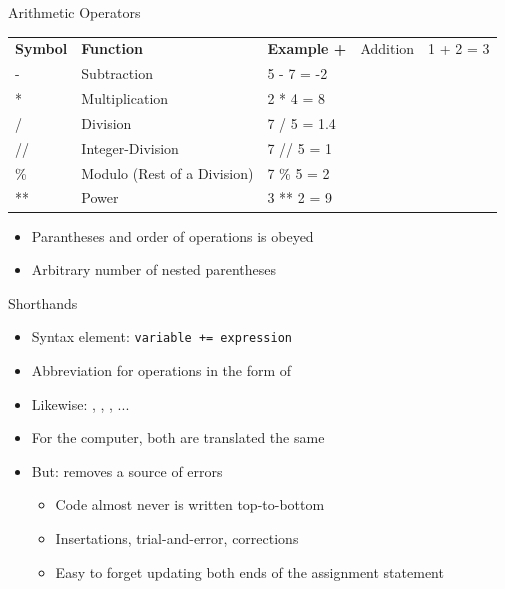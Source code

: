 \begin{frame}{Arithmetic Operators}
%
%
%
\begin{tabularx}
	{\linewidth}
	{OFX}
	\toprule[1.5pt]

	\normalfont	\bfseries Symbol &
				\bfseries Function &
				\bfseries Example
	\tabcrlf
	+  & Addition                    & 1 + 2 = 3 \\
	-  & Subtraction                 & 5 - 7 = -2 \\
	*  & Multiplication              & 2 * 4 = 8 \\
	/  & Division                    & 7 / 5 = 1.4 \\
	// & Integer-Division            & 7 // 5 = 1 \\
	\% & Modulo (Rest of a Division) & 7 \% 5 = 2 \\
	** & Power                       & 3 ** 2 = 9 \\
	
	\bottomrule[1.5pt]	
\end{tabularx}
\begin{itemize}
\item Parantheses and order of operations is obeyed
\item Arbitrary number of nested parentheses
\end{itemize}
%
\end{frame}


\begin{frame}{Shorthands}
%
\begin{itemize}
\item Syntax element: \texttt{variable += expression}
\item Abbreviation for operations in the form of 
\item Likewise: \inPy{-=}, \inPy{*=}, \inPy{/=}, ...
\item For the computer, both are translated the same
\item But: removes a source of errors
	\begin{itemize}
	\item Code almost never is written top-to-bottom
	\item Insertations, trial-and-error, corrections
	\item Easy to forget updating both ends of the assignment statement
	\end{itemize}
\end{itemize}
%
\end{frame}

